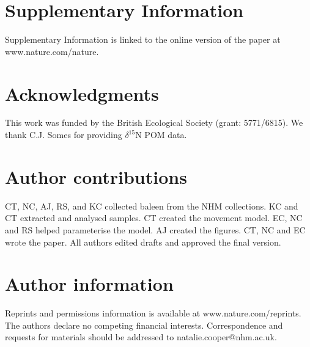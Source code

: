 \documentclass[a4paper,12pt]{article}
\begin{document}




\section{Supplementary Information}
Supplementary Information is linked to the online version of the paper at www.nature.com/nature.

\section{Acknowledgments}
This work was funded by the British Ecological Society (grant: 5771/6815). 
We thank C.J. Somes for providing  $\delta^{15}$N POM data.

\section{Author contributions}
CT, NC, AJ, RS, and KC collected baleen from the NHM collections. 
KC and CT extracted and analysed samples.
CT created the movement model.
EC, NC and RS helped parameterise the model.
AJ created the figures. 
CT, NC and EC wrote the paper.
All authors edited drafts and approved the final version.

\section{Author information}
Reprints and permissions information is available at www.nature.com/reprints.
The authors declare no competing financial interests.
Correspondence and requests for materials should be addressed to natalie.cooper@nhm.ac.uk.


\end{document}

